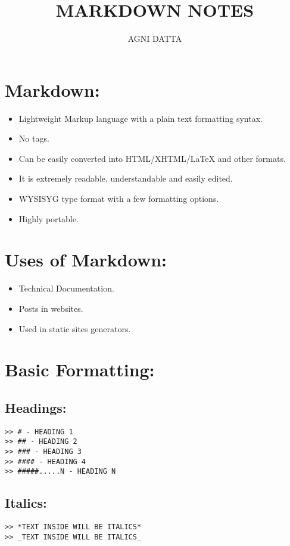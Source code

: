 \documentclass[british]{article}
\begin{document}
\title{\textbf{MARKDOWN NOTES}}
\author{AGNI DATTA}

\maketitle
{\small{}\tableofcontents{}}{\small\par}

\pagebreak{}

\section{Markdown:}
\begin{itemize}
\item Lightweight Markup language with a plain text formatting syntax. 
\item No tags. 
\item Can be easily converted into HTML/XHTML/\LaTeX\: and other formats. 
\item It is extremely readable, understandable and easily edited. 
\item WYSISYG type format with a few formatting options. 
\item Highly portable. 
\end{itemize}

\section{Uses of Markdown:}
\begin{itemize}
\item Technical Documentation. 
\item Posts in websites. 
\item Used in static sites generators. 
\end{itemize}

\section{Basic Formatting:}

\subsection{Headings:}
\begin{verbatim}
>> # - HEADING 1
>> ## - HEADING 2
>> ### - HEADING 3
>> #### - HEADING 4
>> #####.....N - HEADING N
\end{verbatim}

\subsection{Italics:}
\begin{verbatim}
>> *TEXT INSIDE WILL BE ITALICS*
>> _TEXT INSIDE WILL BE ITALICS_
\end{verbatim}
\end{document}
